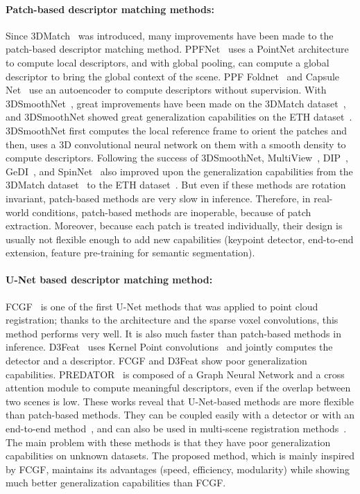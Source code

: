 \documentclass[10pt,twocolumn,letterpaper]{article}
\begin{document}
\paragraph{Patch-based descriptor matching methods:}
Since 3DMatch~\cite{zeng20163dmatch} was introduced, many improvements have been made to the patch-based descriptor matching method. PPFNet~\cite{deng2018ppfnet} uses a PointNet architecture to compute local descriptors, and with global pooling, can compute a global descriptor to bring the global context of the scene. PPF Foldnet~\cite{deng2018ppffoldnet} and Capsule Net~\cite{Zhao_2019_CVPR} use an autoencoder to compute descriptors without supervision. With 3DSmoothNet~\cite{gojcic2018perfect}, great improvements have been made on the 3DMatch dataset~\cite{zeng20163dmatch}, and 3DSmoothNet showed great generalization capabilities on the ETH dataset~\cite{Pomerleau:2012}. 3DSmoothNet first computes the local reference frame to orient the patches and then, uses a 3D convolutional neural network on them with a smooth density to compute descriptors. Following the success of 3DSmoothNet, MultiView~\cite{Li_2020_CVPR}, DIP~\cite{Poiesi2021}, GeDI~\cite{Poiesi2021gedi}, and SpinNet~\cite{ao2020SpinNet} also improved upon the generalization capabilities from the 3DMatch dataset~\cite{zeng20163dmatch} to the ETH dataset~\cite{Pomerleau:2012}.
But even if these methods are rotation invariant, patch-based methods are very slow in inference.
Therefore, in real-world conditions, patch-based methods are inoperable, because of patch extraction.
Moreover, because each patch is treated individually, their design is usually not flexible enough to add new capabilities (keypoint detector, end-to-end extension, feature pre-training for semantic segmentation). 


\paragraph{U-Net based descriptor matching method:}
FCGF~\cite{choy2019fully} is one of the first U-Net methods that was applied to point cloud registration; thanks to the architecture and the sparse voxel convolutions, this method performs very well. It is also much faster than patch-based methods in inference. D3Feat~\cite{bai2020d3feat} uses Kernel Point convolutions~\cite{thomas2019KPConv} and jointly computes the detector and a descriptor.
FCGF and D3Feat show poor generalization capabilities.
PREDATOR~\cite{huang2020predator} is composed of a Graph Neural Network and a cross attention module to compute meaningful descriptors, even if the overlap between two scenes is low.
These works reveal that U-Net-based methods are more flexible than patch-based methods. They can be coupled easily with a detector or with an end-to-end method~\cite{choy2020deep}, and can also be used in multi-scene registration methods~\cite{gojcic2020learning}. The main problem with these methods is that they have poor generalization capabilities on unknown datasets. 
The proposed method, which is mainly inspired by FCGF, maintains its advantages (speed, efficiency, modularity) while showing much better generalization capabilities than FCGF.
\end{document}
